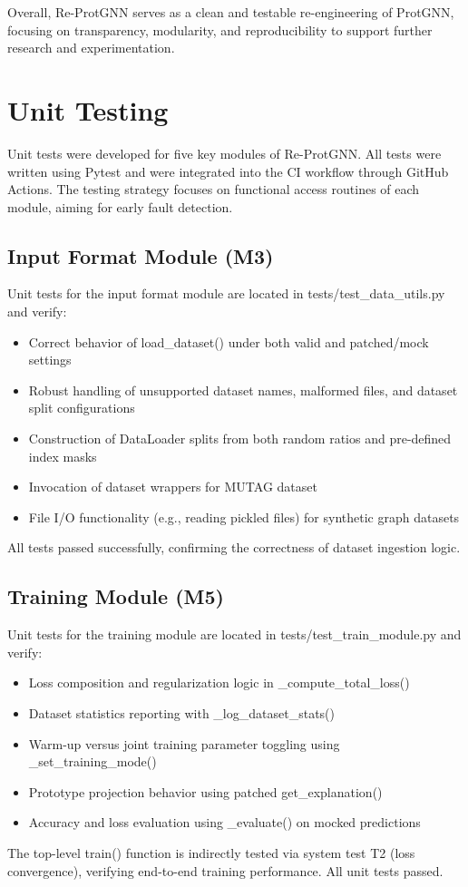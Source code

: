 \documentclass[12pt, titlepage]{article}
\begin{document}
Overall, Re-ProtGNN serves as a clean and testable re-engineering of ProtGNN, focusing on transparency, modularity, and reproducibility to support further research and experimentation.


\section{Unit Testing}
Unit tests were developed for five key modules of Re-ProtGNN. All tests were written using Pytest and were integrated into the CI workflow through GitHub Actions. The testing strategy focuses on functional access routines of each module, aiming for early fault detection.

\subsection{Input Format Module (M3)}
Unit tests for the input format module are located in tests/test\_data\_utils.py and verify:
\begin{itemize}
\item Correct behavior of load\_dataset() under both valid and patched/mock settings
\item Robust handling of unsupported dataset names, malformed files, and dataset split configurations
\item Construction of DataLoader splits from both random ratios and pre-defined index masks
\item Invocation of dataset wrappers for MUTAG dataset \citep{debnath1991structure}
\item File I/O functionality (e.g., reading pickled files) for synthetic graph datasets
\end{itemize}
All tests passed successfully, confirming the correctness of dataset ingestion logic.

\subsection{Training Module (M5)}
Unit tests for the training module are located in tests/test\_train\_module.py and verify:
\begin{itemize}
\item Loss composition and regularization logic in \_compute\_total\_loss()
\item Dataset statistics reporting with \_log\_dataset\_stats()
\item Warm-up versus joint training parameter toggling using \_set\_training\_mode()
\item Prototype projection behavior using patched get\_explanation()
\item Accuracy and loss evaluation using \_evaluate() on mocked predictions
\end{itemize}
The top-level train() function is indirectly tested via system test T2 (loss convergence), verifying end-to-end training performance. All unit tests passed.
\end{document}
